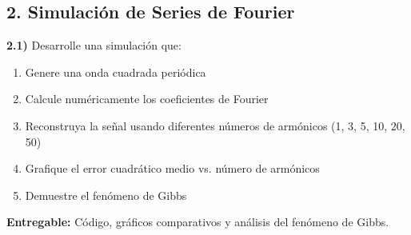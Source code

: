 \subsection*{2. Simulación de Series de Fourier}

\textbf{2.1)} Desarrolle una simulación que:
\begin{enumerate}[label=\alph*)]
    \item Genere una onda cuadrada periódica
    \item Calcule numéricamente los coeficientes de Fourier
    \item Reconstruya la señal usando diferentes números de armónicos (1, 3, 5, 10, 20, 50)
    \item Grafique el error cuadrático medio vs. número de armónicos
    \item Demuestre el fenómeno de Gibbs
\end{enumerate}

\textbf{Entregable:} Código, gráficos comparativos y análisis del fenómeno de Gibbs.